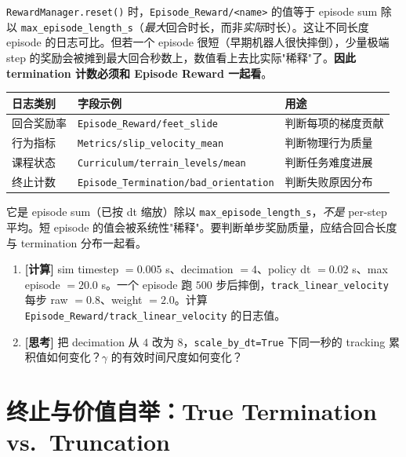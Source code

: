 \verb|RewardManager.reset()| 时，\verb|Episode_Reward/<name>| 的值等于 episode sum 除以 \verb|max_episode_length_s|（\emph{最大}回合时长，而非\emph{实际}时长）。这让不同长度 episode 的日志可比。但若一个 episode 很短（早期机器人很快摔倒），少量极端 step 的奖励会被摊到最大回合秒数上，数值看上去比实际"稀释"了。\textbf{因此 termination 计数必须和 Episode Reward 一起看}。

\begin{center}
\small
\begin{tabular}{@{}lll@{}}
\toprule
日志类别 & 字段示例 & 用途 \\
\midrule
回合奖励率 & \verb|Episode_Reward/feet_slide| & 判断每项的梯度贡献 \\
行为指标 & \verb|Metrics/slip_velocity_mean| & 判断物理行为质量 \\
课程状态 & \verb|Curriculum/terrain_levels/mean| & 判断任务难度进展 \\
终止计数 & \verb|Episode_Termination/bad_orientation| & 判断失败原因分布 \\
\bottomrule
\end{tabular}
\end{center}

\begin{pitfall}
它是 episode sum（已按 dt 缩放）除以 \verb|max_episode_length_s|，\emph{不是} per-step 平均。短 episode 的值会被系统性"稀释"。要判断单步奖励质量，应结合回合长度与 termination 分布一起看。
\end{pitfall}

\begin{practice}[练习·时间缩放]
\begin{enumerate}
  \item \textbf{[计算]} sim timestep $=0.005$ s、decimation $=4$、policy dt $=0.02$ s、max episode $=20.0$ s。一个 episode 跑 $500$ 步后摔倒，\verb|track_linear_velocity| 每步 raw $=0.8$、weight $=2.0$。计算 \verb|Episode_Reward/track_linear_velocity| 的日志值。
  \item \textbf{[思考]} 把 decimation 从 $4$ 改为 $8$，\verb|scale_by_dt=True| 下同一秒的 tracking 累积值如何变化？$\gamma$ 的有效时间尺度如何变化？
\end{enumerate}
\end{practice}

\section{终止与价值自举：True Termination vs.\ Truncation}
\label{sec:rlmc-rew-term}

